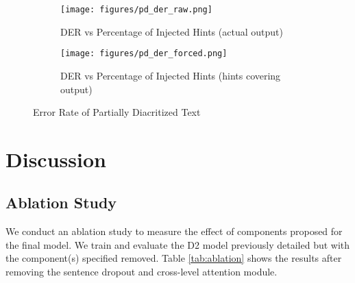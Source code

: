 \documentclass[11pt]{article}
\begin{document}
\begin{figure}[h]
\centering
\begin{subfigure}{.5\textwidth}
  \centering
  \texttt{[image: figures/pd\_der\_raw.png]}
  \caption{DER vs Percentage of Injected Hints (actual output)}
  \label{fig:pd_der_raw}
\end{subfigure}\begin{subfigure}{.5\textwidth}
  \centering
  \texttt{[image: figures/pd\_der\_forced.png]}
  \caption{DER vs Percentage of Injected Hints (hints covering output)}
  \label{fig:pd_der_masked}
\end{subfigure}
\caption{Error Rate of Partially Diacritized Text}
\label{fig:pd}
\end{figure}


\section{Discussion}

\subsection{Ablation Study}

We conduct an ablation study to measure the effect of components proposed for the final model. We train and evaluate the D2 model previously detailed but with the component(s) specified removed. Table \ref{tab:ablation} shows the results after removing the sentence dropout and cross-level attention module.
\end{document}
